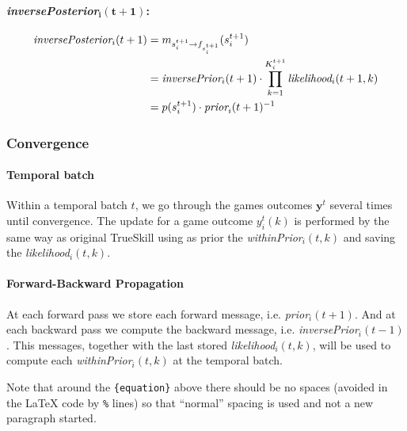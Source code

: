 \documentclass[article]{jss}
\newcommand{\vm}[1]{\mathbf{#1}}
\begin{document}
  \paragraph{\emph{inversePosterior}$\bm{_i(t+1)}$: }

 \begin{equation}
 \begin{split}
 \emph{inversePosterior}_i(t+1) &= m_{s_i^{t+1} \rightarrow f_{s_i^{t+1}}}(s_i^{t+1}) \\
 &= \emph{inversePrior}_i(t+1) \cdot \prod_{k=1}^{K_i^{t+1}} \emph{likelihood}_i(t+1,k) \\
 &= p(s_i^{t+1}) \cdot \emph{prior}_i(t+1)^{-1}
 \end{split}
 \end{equation}

\subsubsection{Convergence}

\paragraph{Temporal batch} Within a temporal batch $t$, we go through the games outcomes $\vm{y}^t$ several times until convergence.
The update for a game outcome $y^t_i(k)$ is performed by the same way as original TrueSkill using as prior the \emph{withinPrior}$_i(t,k)$ and saving the \emph{likelihood}$_i(t,k)$.

\paragraph{Forward-Backward Propagation}
At each forward pass we store each forward message, i.e. \emph{prior}$_i(t+1)$.
And at each backward pass we compute the backward message, i.e. \emph{inversePrior}$_i(t-1)$.
This messages, together with the last stored \emph{likelihood}$_i(t,k)$, will be used to compute each \emph{withinPrior}$_i(t,k)$ at the temporal batch.

















\begin{leftbar}
Note that around the \verb|{equation}| above there should be no spaces (avoided
in the {\LaTeX} code by \verb|%| lines) so that ``normal'' spacing is used and
not a new paragraph started.
\end{leftbar}
\end{document}
